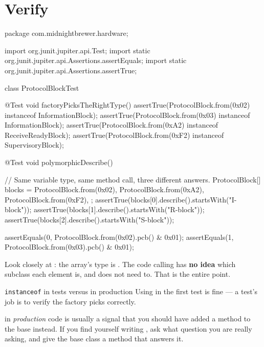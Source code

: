 \section{Verify}

\begin{jcode}
package com.midnightbrewer.hardware;

import org.junit.jupiter.api.Test;
import static org.junit.jupiter.api.Assertions.assertEquals;
import static org.junit.jupiter.api.Assertions.assertTrue;

class ProtocolBlockTest {

    @Test
    void factoryPicksTheRightType() {
        assertTrue(ProtocolBlock.from(0x02) instanceof InformationBlock);
        assertTrue(ProtocolBlock.from(0x03) instanceof InformationBlock);
        assertTrue(ProtocolBlock.from(0xA2) instanceof ReceiveReadyBlock);
        assertTrue(ProtocolBlock.from(0xF2) instanceof SupervisoryBlock);
    }

    @Test
    void polymorphicDescribe() {
        // Same variable type, same method call, three different answers.
        ProtocolBlock[] blocks = {
            ProtocolBlock.from(0x02),
            ProtocolBlock.from(0xA2),
            ProtocolBlock.from(0xF2),
        };
        assertTrue(blocks[0].describe().startsWith("I-block"));
        assertTrue(blocks[1].describe().startsWith("R-block"));
        assertTrue(blocks[2].describe().startsWith("S-block"));

        assertEquals(0, ProtocolBlock.from(0x02).pcb() & 0x01);
        assertEquals(1, ProtocolBlock.from(0x03).pcb() & 0x01);
    }
}
\end{jcode}

Look closely at : the array's type is
. The code calling  has \textbf{no idea}
which subclass each element is, and does not need to. That is the entire point.

\begin{deeper}{\texttt{instanceof} in tests versus in production}
Using  in the first test is fine --- a test's job is to verify
the factory picks correctly.

 in \emph{production} code is usually a signal that you should
have added a method to the base instead. If you find yourself writing
, ask what question you are
really asking, and give the base class a method that answers it.
\end{deeper}

